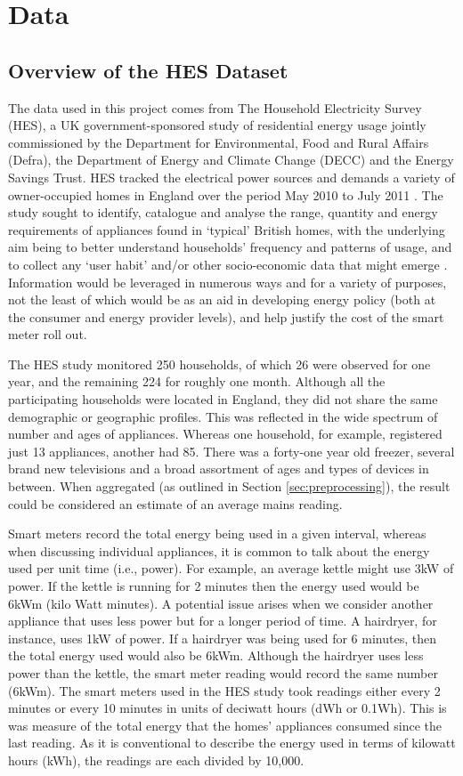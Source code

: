 \chapter{Data}


\section{Overview of the HES Dataset}
The data used in this project comes from The Household Electricity Survey (HES), a UK government-sponsored study of residential energy usage jointly commissioned by the Department for Environmental, Food and Rural Affairs (Defra), the Department of Energy and Climate Change (DECC) and the Energy Savings Trust.  HES tracked the electrical power sources and demands  a variety of owner-occupied homes in England over the period May 2010 to July 2011 \cite{HES,EST_1,EST_2}. The study sought to identify, catalogue and analyse the range, quantity and energy requirements of appliances found in `typical' British homes, with the underlying aim being to better understand households' frequency and patterns of usage, and to collect any `user habit' and/or other socio-economic data that might emerge \cite{EST_2,early_findings}.  Information would be leveraged in numerous ways and for a variety of purposes, not the least of which would be as an aid in developing energy policy (both at the consumer and energy provider levels), and help justify the cost of the smart meter roll out.   

The HES study monitored 250 households, of which 26 were observed for one year, and the remaining 224 for roughly one month. Although all the participating households were located in England, they did not share the same demographic or geographic profiles.   This was reflected in the wide spectrum of number and ages of appliances.  Whereas one household, for example, registered just 13 appliances, another had 85.  There was a forty-one year old freezer, several brand new televisions and a broad assortment of ages and types of devices in between. When aggregated (as outlined in Section \ref{sec:preprocessing}), the result could be considered an estimate of an average mains reading. 

Smart meters record the total energy being used in a given interval, whereas when discussing individual appliances, it is common to talk about the energy used per unit time (i.e., power). For example, an average kettle might use 3kW of power. If the kettle is running for 2 minutes then the energy used would be 6kWm (kilo Watt minutes). A potential issue arises when we consider another appliance that uses less power but for a longer period of time. A hairdryer, for instance, uses 1kW of power. If a hairdryer was being used for 6 minutes, then the total energy used would also be 6kWm. Although the hairdryer uses less power than the kettle, the smart meter reading would record the same number (6kWm). The smart meters used in the HES study took readings either every 2 minutes or every 10 minutes in units of deciwatt hours (dWh or 0.1Wh). This is was measure of the total energy that the homes' appliances consumed since the last reading. As it is conventional to describe the energy used in terms of kilowatt hours (kWh), the readings are each divided by 10,000.

